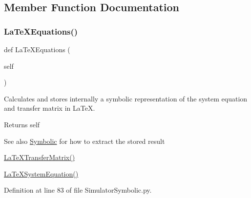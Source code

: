 \subsection{Member Function Documentation}
\mbox{\label{classSignalIntegrity_1_1SystemDescriptions_1_1SimulatorSymbolic_1_1SimulatorSymbolic_a3f6cd3290ceb07e8985e1eb832be3934}} 
\subsubsection{\texorpdfstring{La\+Te\+X\+Equations()}{LaTeXEquations()}}
{\footnotesize\ttfamily def La\+Te\+X\+Equations (\begin{DoxyParamCaption}\item[{}]{self }\end{DoxyParamCaption})}



Calculates and stores internally a symbolic representation of the system equation and transfer matrix in La\+TeX. 

\begin{DoxyReturn}{Returns}
self 
\end{DoxyReturn}
\begin{DoxySeeAlso}{See also}
\hyperlink{namespaceSignalIntegrity_1_1SystemDescriptions_1_1Symbolic}{Symbolic} for how to extract the stored result 

\hyperlink{classSignalIntegrity_1_1SystemDescriptions_1_1SimulatorSymbolic_1_1SimulatorSymbolic_adc83c150e43916083e3379cd4b9bb80e}{La\+Te\+X\+Transfer\+Matrix()} 

\hyperlink{classSignalIntegrity_1_1SystemDescriptions_1_1SystemDescriptionSymbolic_1_1SystemDescriptionSymbolic_ab91378c2a97ec0d38ee1c70988142eb5}{La\+Te\+X\+System\+Equation()} 
\end{DoxySeeAlso}


Definition at line 83 of file Simulator\+Symbolic.\+py.

